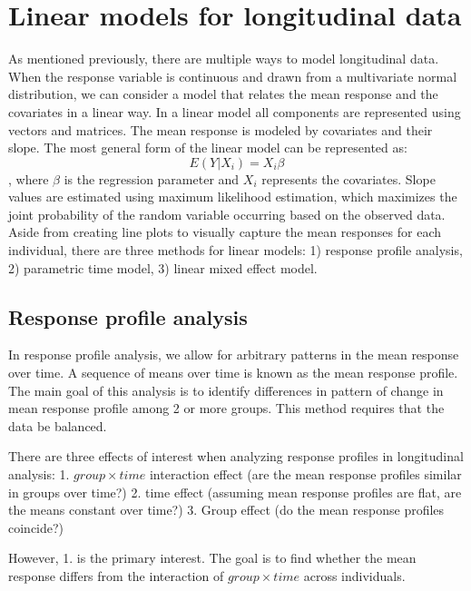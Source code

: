 \documentclass[12pt, twoside]{amherstthesis}
\theoremstyle{definition}
\theoremstyle{definition}
\theoremstyle{definition}
\theoremstyle{remark}
\begin{document}
\hypertarget{linear-models-for-longitudinal-data}{%
\section{Linear models for longitudinal data}\label{linear-models-for-longitudinal-data}}

As mentioned previously, there are multiple ways to model longitudinal data. When the response variable is continuous and drawn from a multivariate normal distribution, we can consider a model that relates the mean response and the covariates in a linear way. In a linear model all components are represented using vectors and matrices. The mean response is modeled by covariates and their slope. The most general form of the linear model can be represented as:
\[E(Y|X_i)=X_i\beta\], where \(\beta\) is the regression parameter and \(X_i\) represents the covariates. Slope values are estimated using maximum likelihood estimation, which maximizes the joint probability of the random variable occurring based on the observed data. Aside from creating line plots to visually capture the mean responses for each individual, there are three methods for linear models: 1) response profile analysis, 2) parametric time model, 3) linear mixed effect model.

\hypertarget{response-profile-analysis}{%
\subsection{Response profile analysis}\label{response-profile-analysis}}

In response profile analysis, we allow for arbitrary patterns in the mean response over time. A sequence of means over time is known as the mean response profile. The main goal of this analysis is to identify differences in pattern of change in mean response profile among 2 or more groups. This method requires that the data be balanced.

There are three effects of interest when analyzing response profiles in longitudinal analysis:
1. \(group \times time\) interaction effect (are the mean response profiles similar in groups over time?)
2. time effect (assuming mean response profiles are flat, are the means constant over time?)
3. Group effect (do the mean response profiles coincide?)

However, 1. is the primary interest. The goal is to find whether the mean response differs from the interaction of \(group \times time\) across individuals.
\end{document}
